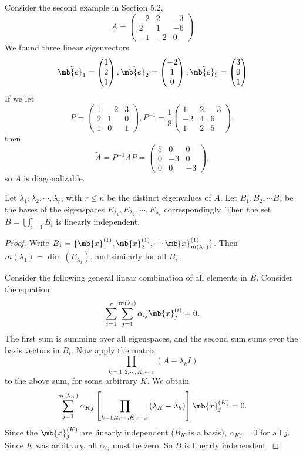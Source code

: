 \documentclass[a4paper]{article}
\begin{document}
Consider the second example in Section 5.2,
\[
A = \begin{pmatrix}
  -2 & 2 & -3\\
  2 & 1 & -6\\
  -1 & -2 & 0
\end{pmatrix}
\]
We found three linear eigenvectors
\[
\tilde{\mb{e}_1} = 
\begin{pmatrix}
  1\\2\\1
\end{pmatrix}, \tilde{\mb{e}_2} = 
\begin{pmatrix}
  -2\\1\\0
\end{pmatrix}, \tilde{\mb{e}_3} = 
\begin{pmatrix}
  3\\0\\1
\end{pmatrix}
\]
If we let 
\[
P = 
\begin{pmatrix}
  1 & -2 & 3\\
  2 & 1 & 0\\
  1 & 0 & 1
\end{pmatrix}, P^{-1} = \frac{1}{8}
\begin{pmatrix}
  1 & 2 & -3\\
  -2 & 4 & 6\\
  1 & 2 & 5
\end{pmatrix},
\]
then 
\[
\tilde{A} = P^{-1}AP = 
\begin{pmatrix}
  5 & 0 & 0\\
  0 & -3 & 0\\
  0 & 0 & -3
\end{pmatrix},
\]
so $A$ is diagonalizable.

\begin{thm}
  Let $\lambda_1, \lambda_2, \cdots, \lambda_r$, with $r \leq n$ be the distinct eigenvalues of $A$. Let $B_1, B_2, \cdots B_r$ be the bases of the eigenspaces $E_{\lambda_1}, E_{\lambda_2}, \cdots, E_{\lambda_r}$ correspondingly. Then the set $\displaystyle B = \bigcup_{i= 1}^r B_i$ is linearly independent. 
\end{thm}

\begin{proof}
  Write $B_1 = \{\mb{x}_1^{(1)}, \mb{x}_2^{(1)}, \cdots \mb{x}_{m(\lambda_1)}^{(1)}\}$. Then $m(\lambda_1) = \dim (E_{\lambda_1})$, and similarly for all $B_i$.

Consider the following general linear combination of all elements in $B$. Consider the equation
\[
\sum_{i = 1}^r\sum_{j = 1}^{m(\lambda_i)} \alpha_{ij} \mb{x}_j^{(i)} = 0.
\]
The first sum is summing over all eigenspaces, and the second sum sums over the basis vectors in $B_i$. Now apply the matrix
\[
\prod_{k = 1, 2, \cdots, \bar{K}, \cdots, r} (A - \lambda_kI)
\]
to the above sum, for some arbitrary $K$. We obtain
\[
\sum_{j = 1}^{m(\lambda_K)}\alpha_{Kj}\left[\prod_{k = 1, 2, \cdots, \bar{K}, \cdots, r}(\lambda_K - \lambda_k)\right]\mb{x}_j^{(K)} = 0.
\]
Since the $\mb{x}^{(K)}_j$ are linearly independent ($B_K$ is a basis), $\alpha_{Kj} = 0$ for all $j$. Since $K$ was arbitrary, all $\alpha_{ij}$ must be zero. So $B$ is linearly independent.
\end{proof}
\end{document}
